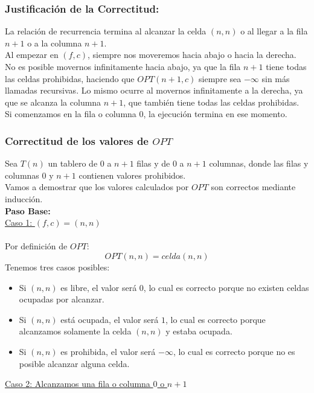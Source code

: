 \subsubsection{Justificación de la Correctitud:}

La relación de recurrencia termina al alcanzar la celda $(n,n)$ o al llegar a la fila $n+1$ o a la columna $n+1$. \\
Al empezar en \( (f,c) \), siempre nos moveremos hacia abajo o hacia la derecha. No es posible movernos infinitamente hacia abajo, ya que la fila $n+1$ tiene todas las celdas prohibidas, haciendo que \( OPT(n+1,c) \) siempre sea $-\infty$ sin más llamadas recursivas. Lo mismo ocurre al movernos infinitamente a la derecha, ya que se alcanza la columna $n+1$, que también tiene todas las celdas prohibidas.\\
Si comenzamos en la fila o columna $0$, la ejecución termina en ese momento.\\

\subsubsection{Correctitud de los valores de $OPT$}

Sea $T(n)$ un tablero de $0$ a $n+1$ filas y de $0$ a $n+1$ columnas,
donde las filas y columnas $0$ y $n+1$ contienen valores prohibidos. \\

Vamos a demostrar que los valores calculados por $OPT$ son correctos mediante inducción.\\

\textbf{Paso Base:} \\

\underline{Caso 1: $(f,c) = (n,n)$} \\\\
Por definición de $OPT$:
\[
	OPT(n,n) = celda(n,n)
\]
Tenemos tres casos posibles:
\begin{itemize}
	\item Si $(n,n)$ es libre, el valor será $0$, lo cual es correcto porque no existen celdas ocupadas por alcanzar.
	\item Si $(n,n)$ está ocupada, el valor será \( 1 \), lo cual es correcto porque alcanzamos solamente la celda $(n,n)$ y estaba ocupada.
	\item Si $(n,n)$ es prohibida, el valor será $-\infty$, lo cual es correcto porque no es posible alcanzar alguna celda.
\end{itemize}
\underline{Caso 2: Alcanzamos una fila o columna $0$ o $n+1$} \\

